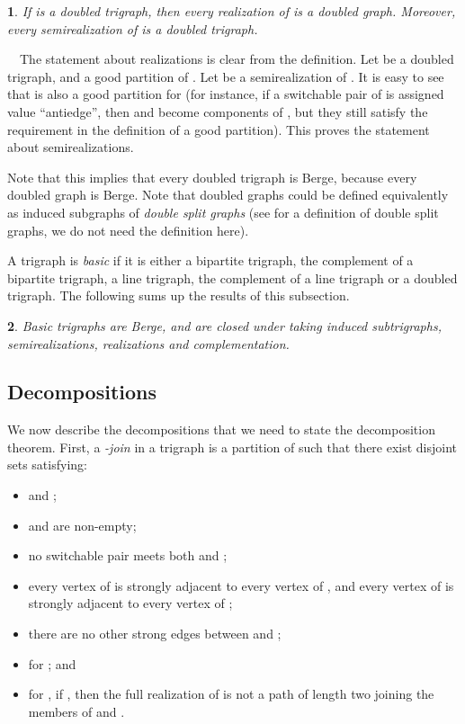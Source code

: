\documentclass[11 pt] {article}
\newcommand\blackslug{\hbox{\hskip 1pt \vrule width 4pt height 8pt depth 1.5pt
        \hskip 1pt}}
\newcommand\bbox{\hfill \quad \blackslug \medbreak}
\newtheorem{theorem}{}[section]
\newtheorem{lemma}[theorem]{}
\newcounter{claim}
\newcommand{\Proof}{\setcounter{claim}{0}\noindent{\bf Proof.}\ \ }
\begin{document}
\begin{theorem}
\label{bicotri} 
If  is a doubled trigraph, then every realization of  is a
doubled graph.  Moreover, every semirealization of  is a doubled
trigraph.
\end{theorem}

\Proof The statement about realizations is clear from the
definition. Let  be a doubled trigraph, and  a good
partition of .  Let  be a semirealization of .  It is easy
to see that  is also a good partition for  (for instance,
if a switchable pair  of  is assigned value ``antiedge'',
then  and  become components of , but they still
satisfy the requirement in the definition of a good partition).
This proves the statement about semirealizations.  \bbox

Note that this implies that every doubled trigraph is Berge, because
every doubled graph is Berge.  Note that doubled graphs could be
defined equivalently as induced subgraphs of \emph{double split
  graphs} (see \cite{CRST} for a definition of double split graphs, we
do not need the definition here).

A trigraph is \emph{basic} if it is either a bipartite trigraph, the
complement of a bipartite trigraph, a line trigraph, the complement of
a line trigraph or a doubled trigraph.  The following sums up the
results of this subsection.

\begin{lemma}
  \label{l:presBas}
  Basic trigraphs are Berge, and are closed under taking induced
  subtrigraphs, semirealizations, realizations and complementation.
\end{lemma}

\subsection{Decompositions}

We now describe the decompositions that we need to state the
decomposition theorem. First, a {\em -join} in a trigraph  is a
partition  of  such that there exist disjoint sets
 satisfying:

\begin{itemize}
\item  and ;
\item  and  are non-empty;
\item no switchable pair meets both  and ;
\item every vertex of  is strongly adjacent to every vertex of
  , and every vertex of  is strongly adjacent to every
  vertex of ;
\item there are no other strong edges between  and ; 
\item for  ; and 
\item for , if , then the full realization of
 is not a path of length two joining the members of  and .
\end{itemize}
\end{document}
